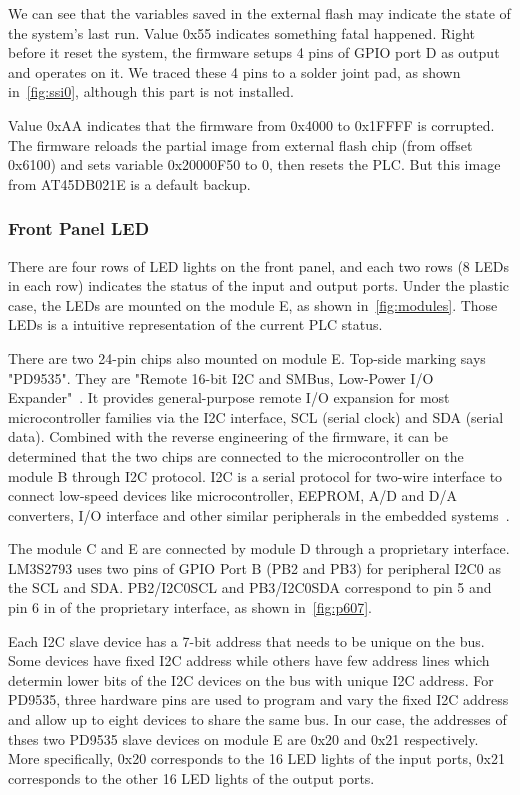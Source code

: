 We can see that the variables saved in the external flash may indicate the state of the system's last run. Value 0x55 indicates something fatal happened. Right before it reset the system, the firmware setups 4 pins of GPIO port D as output and operates on it. We traced these 4 pins to a solder joint pad, as shown in~\autoref{fig:ssi0}, although this part is not installed.

Value 0xAA indicates that the firmware from 0x4000 to 0x1FFFF is corrupted. The firmware reloads the partial image from external flash chip (from offset 0x6100) and sets variable 0x20000F50 to 0, then resets the PLC. But this image from AT45DB021E is a default backup.


\subsubsection{Front Panel LED}

There are four rows of LED lights on the front panel, and each two rows (8 LEDs in each row) indicates the status of the input and output ports. Under the plastic case, the LEDs are mounted on the module E, as shown in~\autoref{fig:modules}. Those LEDs is a intuitive representation of the current PLC status.

There are two 24-pin chips also mounted on module E. Top-side marking says "PD9535". They are "Remote 16-bit I2C and SMBus, Low-Power I/O Expander"~\cite{pd9535}. It provides general-purpose remote I/O expansion for most microcontroller families via the I2C interface, SCL (serial clock) and SDA (serial data). Combined with the reverse engineering of the firmware, it can be determined that the two chips are connected to the microcontroller on the module B through I2C protocol. I2C is a serial protocol for two-wire interface to connect low-speed devices like microcontroller, EEPROM, A/D and D/A converters, I/O interface and other similar peripherals in the embedded systems~\cite{semiconductors2000i2c}.

The module C and E are connected by module D through a proprietary interface. LM3S2793 uses two pins of GPIO Port B (PB2 and PB3) for peripheral I2C0 as the SCL and SDA. PB2/I2C0SCL and PB3/I2C0SDA correspond to pin 5 and pin 6 in of the  proprietary interface, as shown in~\autoref{fig:p607}.

Each I2C slave device has a 7-bit address that needs to be unique on the bus. Some devices have fixed I2C address while others have few address lines which determin lower bits of the I2C devices on the bus with unique I2C address. For PD9535, three hardware pins are used to program and vary the fixed I2C address and allow up to eight devices to share the same bus. In our case, the addresses of thses two PD9535 slave devices on module E are 0x20 and 0x21 respectively. More specifically, 0x20 corresponds to the 16 LED lights of the input ports, 0x21 corresponds to the other 16 LED lights of the output ports. 

